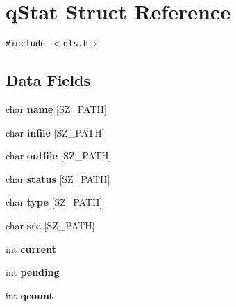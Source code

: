 \hypertarget{structqStat}{
\section{qStat Struct Reference}
\label{structqStat}
}
{\tt \#include $<$dts.h$>$}

\subsection*{Data Fields}
\begin{CompactItemize}
\item 
\hypertarget{structqStat_1ffe1273fbed325e807c6b383e597dd3}{
char \textbf{name} \mbox{[}SZ\_\-PATH\mbox{]}}
\label{structqStat_1ffe1273fbed325e807c6b383e597dd3}

\item 
\hypertarget{structqStat_75c4e78019b64aede0bde5c31f1581b6}{
char \textbf{infile} \mbox{[}SZ\_\-PATH\mbox{]}}
\label{structqStat_75c4e78019b64aede0bde5c31f1581b6}

\item 
\hypertarget{structqStat_d39ba785e45714c4ca3ae3469e5342f8}{
char \textbf{outfile} \mbox{[}SZ\_\-PATH\mbox{]}}
\label{structqStat_d39ba785e45714c4ca3ae3469e5342f8}

\item 
\hypertarget{structqStat_2422b15a98d1f639d756aff109545bbc}{
char \textbf{status} \mbox{[}SZ\_\-PATH\mbox{]}}
\label{structqStat_2422b15a98d1f639d756aff109545bbc}

\item 
\hypertarget{structqStat_5db9fd88869475cd2e85f8dac491dec9}{
char \textbf{type} \mbox{[}SZ\_\-PATH\mbox{]}}
\label{structqStat_5db9fd88869475cd2e85f8dac491dec9}

\item 
\hypertarget{structqStat_bc731ce21945566e093e0a9823835717}{
char \textbf{src} \mbox{[}SZ\_\-PATH\mbox{]}}
\label{structqStat_bc731ce21945566e093e0a9823835717}

\item 
\hypertarget{structqStat_03c59f9c4e8c849d93f2a377d052b40e}{
int \textbf{current}}
\label{structqStat_03c59f9c4e8c849d93f2a377d052b40e}

\item 
\hypertarget{structqStat_a2714fa666f89f6cbfefa9791962e96b}{
int \textbf{pending}}
\label{structqStat_a2714fa666f89f6cbfefa9791962e96b}

\item 
\hypertarget{structqStat_1d766bce5ff3ab22e5cf3aff1cb3c291}{
int \textbf{qcount}}
\label{structqStat_1d766bce5ff3ab22e5cf3aff1cb3c291}


\end{CompactItemize}
